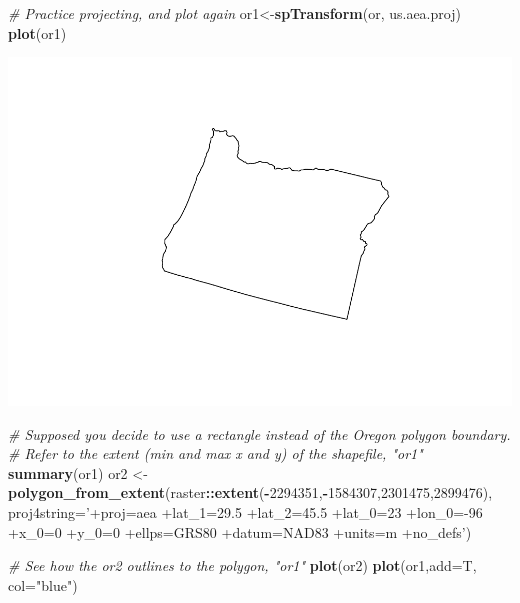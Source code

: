 \documentclass[
]{article}
\newenvironment{Shaded}{\begin{snugshade}}{\end{snugshade}}
\newcommand{\CommentTok}[1]{\textcolor[rgb]{0.56,0.35,0.01}{\textit{#1}}}
\newcommand{\DataTypeTok}[1]{\textcolor[rgb]{0.13,0.29,0.53}{#1}}
\newcommand{\DecValTok}[1]{\textcolor[rgb]{0.00,0.00,0.81}{#1}}
\newcommand{\KeywordTok}[1]{\textcolor[rgb]{0.13,0.29,0.53}{\textbf{#1}}}
\newcommand{\NormalTok}[1]{#1}
\newcommand{\OperatorTok}[1]{\textcolor[rgb]{0.81,0.36,0.00}{\textbf{#1}}}
\newcommand{\StringTok}[1]{\textcolor[rgb]{0.31,0.60,0.02}{#1}}
\begin{document}
\begin{Shaded}
\begin{Highlighting}[]
\CommentTok{# Practice projecting, and plot again}
\NormalTok{or1<-}\KeywordTok{spTransform}\NormalTok{(or, us.aea.proj)}
\KeywordTok{plot}\NormalTok{(or1)}
\end{Highlighting}
\end{Shaded}

\includegraphics{lab3_patch_design_files/figure-latex/unnamed-chunk-2-3.pdf}

\begin{Shaded}
\begin{Highlighting}[]
\CommentTok{# Supposed you decide to use a rectangle instead of the Oregon polygon boundary.}
\CommentTok{# Refer to the extent (min and max x and y) of the shapefile, "or1"}
\KeywordTok{summary}\NormalTok{(or1)}
\NormalTok{or2 <-}\StringTok{ }\KeywordTok{polygon_from_extent}\NormalTok{(raster}\OperatorTok{::}\KeywordTok{extent}\NormalTok{(}\OperatorTok{-}\DecValTok{2294351}\NormalTok{,}\OperatorTok{-}\DecValTok{1584307}\NormalTok{,}\DecValTok{2301475}\NormalTok{,}\DecValTok{2899476}\NormalTok{), }\DataTypeTok{proj4string=}\StringTok{'+proj=aea +lat_1=29.5 +lat_2=45.5 +lat_0=23 +lon_0=-96 +x_0=0 +y_0=0 +ellps=GRS80 +datum=NAD83 +units=m +no_defs'}\NormalTok{)}

\CommentTok{# See how the or2 outlines to the polygon, "or1"}
\KeywordTok{plot}\NormalTok{(or2)}
\KeywordTok{plot}\NormalTok{(or1,}\DataTypeTok{add=}\NormalTok{T, }\DataTypeTok{col=}\StringTok{"blue"}\NormalTok{)}
\end{Highlighting}
\end{Shaded}
\end{document}
